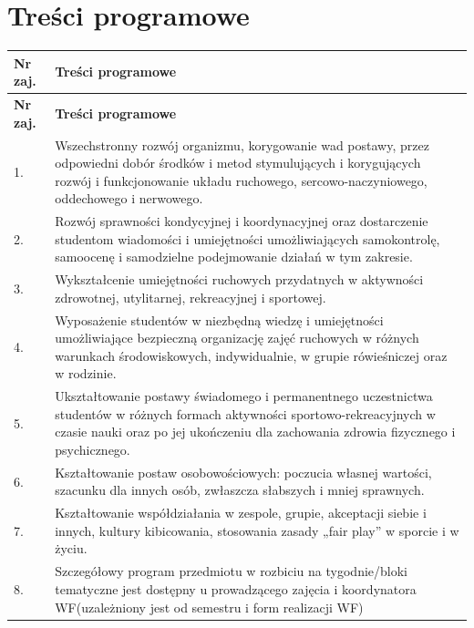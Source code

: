 \documentclass[12pt, a4paper]{article}
\newcommand{\thdrule}{\noalign{\global\setlength{\extrarowheight}{0pt}}}
\newcommand{\thdend}{\noalign{\global\setlength{\extrarowheight}{3pt}}}
\begin{document}
\section{Treści programowe}

{\scriptsize
\begin{longtable}{m{1.5cm}m{14.5cm}}
\thdrule\toprule
\rowcolor{pjatkRed} {\color{white}\textbf{Nr zaj.}} & {\color{white}\textbf{Treści programowe}} \\
\midrule\thdend
\endfirsthead
\thdrule\toprule
\rowcolor{pjatkRed} {\color{white}\textbf{Nr zaj.}} & {\color{white}\textbf{Treści programowe}} \\
\midrule\thdend
\endhead
  \rowcolor{tableRowLight} 1. & Wszechstronny rozwój organizmu, korygowanie wad postawy, przez odpowiedni dobór środków i metod stymulujących i korygujących rozwój i funkcjonowanie układu ruchowego, sercowo-naczyniowego, oddechowego i nerwowego. \\
  \rowcolor{tableRowAlt} 2. & Rozwój sprawności kondycyjnej i koordynacyjnej oraz dostarczenie studentom wiadomości i umiejętności umożliwiających samokontrolę, samoocenę i samodzielne podejmowanie działań w tym zakresie. \\
  \rowcolor{tableRowLight} 3. & Wykształcenie umiejętności ruchowych przydatnych w aktywności zdrowotnej, utylitarnej, rekreacyjnej i sportowej. \\
  \rowcolor{tableRowAlt} 4. & Wyposażenie studentów w niezbędną wiedzę i umiejętności umożliwiające bezpieczną organizację zajęć ruchowych w różnych warunkach środowiskowych, indywidualnie, w grupie rówieśniczej oraz w rodzinie. \\
  \rowcolor{tableRowLight} 5. & Ukształtowanie postawy świadomego i permanentnego uczestnictwa studentów w różnych formach aktywności sportowo-rekreacyjnych w czasie nauki oraz po jej ukończeniu dla zachowania zdrowia fizycznego i psychicznego. \\
  \rowcolor{tableRowAlt} 6. & Kształtowanie postaw osobowościowych: poczucia własnej wartości, szacunku dla innych osób, zwłaszcza słabszych i mniej sprawnych. \\
  \rowcolor{tableRowLight} 7. & Kształtowanie współdziałania w zespole, grupie, akceptacji siebie i innych, kultury kibicowania, stosowania zasady „fair play” w sporcie i w życiu. \\
  \rowcolor{tableRowAlt} 8. & Szczegółowy program przedmiotu w rozbiciu na tygodnie/bloki tematyczne jest dostępny u prowadzącego zajęcia i koordynatora WF(uzależniony jest od semestru i form realizacji WF) \\
\bottomrule
\end{longtable}}
\end{document}
